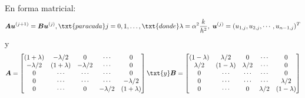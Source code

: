 \documentclass[9pt, aspectratio=169]{beamer}
\begin{document}
\begin{frame}
En forma matricial:
\[ \bm{A} \bm{u}^{(j+1)} = \bm{B} \bm{u}^{(j)}, \txt{para cada} j = 0, 1, \ldots,\txt{donde} \lambda = \alpha^2 \frac{k}{h^2}, \; \bm{u}^{(j)} = (u_{1,j}, u_{2, j}, \cdots, u_{n-1, j})^T \]
y
\[
\bm{A} = \begin{bmatrix}
    (1+\lambda) & -\lambda/2 & 0 & \cdots &  0 \\
    -\lambda/2 & (1+\lambda) & -\lambda/2 & \cdots & 0 \\
    0 & \cdots & \cdots & \cdots &  0 \\
    0 & \cdots & \cdots & \cdots &  -\lambda/2 \\
    0 & \cdots & 0 & -\lambda/2 & (1+\lambda)
\end{bmatrix} \txt{y}
\bm{B} = \begin{bmatrix}
    (1-\lambda) & \lambda/2 & 0 & \cdots &  0 \\
    \lambda/2 & (1-\lambda) & \lambda/2 & \cdots & 0 \\
    0 & \cdots & \cdots & \cdots &  0 \\
    0 & \cdots & \cdots & \cdots &  \lambda/2 \\
    0 & \cdots & 0 & \lambda/2 & (1-\lambda)
\end{bmatrix}
\]
\end{frame}
\end{document}
